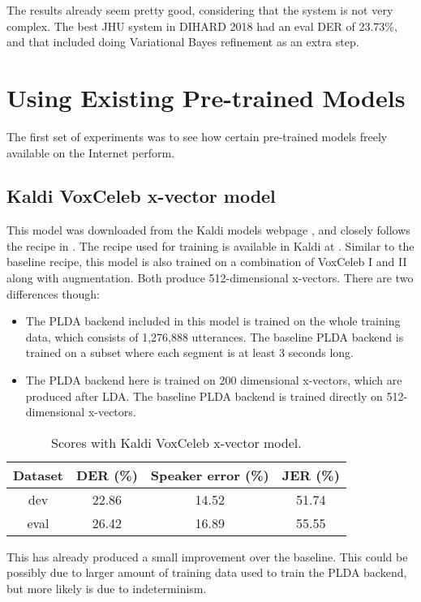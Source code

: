 	The results already seem pretty good, considering that the system is not very complex. The best JHU system in DIHARD 2018 had an eval DER of 23.73\%, and that included doing Variational Bayes refinement as an extra step.

		
	\section{Using Existing Pre-trained Models}
	The first set of experiments was to see how certain pre-trained models freely available on the Internet perform.
	
		\subsection{Kaldi VoxCeleb x-vector model}
			This model was downloaded from the Kaldi models webpage \cite{kaldi_models_webpage}, and closely follows the recipe in \cite{snyder2018x}. The recipe used for training is available in Kaldi at . Similar to the baseline recipe, this model is also trained on a combination of VoxCeleb I and II along with augmentation. Both produce 512-dimensional x-vectors. There are two differences though:
			\begin{itemize}
				\item The PLDA backend included in this model is trained on the whole training data, which consists of 1,276,888 utterances. The baseline PLDA backend is trained on a subset where each segment is at least 3 seconds long.
				\item The PLDA backend here is trained on 200 dimensional x-vectors, which are produced after LDA. The baseline PLDA backend is trained directly on 512-dimensional x-vectors.
			\end{itemize}
	
			\begin{table}[h]
			\centering
			\begin{tabular}{|c|c|c|c|}
				\hline
				Dataset & DER (\%) & Speaker error (\%) & JER (\%) \\
				\hline
				dev & 22.86 & 14.52 & 51.74 \\
				\hline
				eval & 26.42 & 16.89 & 55.55 \\
				\hline
			\end{tabular}
			\caption{Scores with Kaldi VoxCeleb x-vector model.}
			\end{table}
		
			This has already produced a small improvement over the baseline. This could be possibly due to larger amount of training data used to train the PLDA backend, but more likely is due to indeterminism.
		
